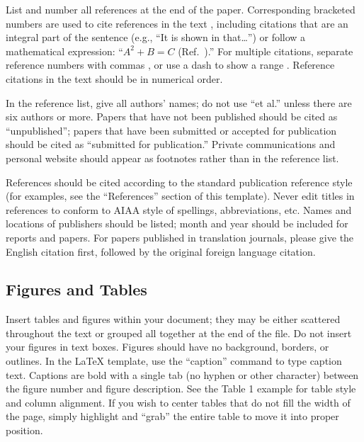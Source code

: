 \documentclass[journal]{new-aiaa}
\begin{document}
List and number all references at the end of the paper. Corresponding bracketed numbers are used to cite references in the text \cite{vatistas1986reverse}, including citations that are an integral part of the sentence (e.g., ``It is shown in \cite{dornheim1996planetary} that\ldots '') or follow a mathematical expression: ``$A^{2} + B = C$ (Ref.~\cite{terster1997nasa}).'' For multiple citations, separate reference numbers with commas \cite{peyret2012computational,oates1997aerothermodynamics}, or use a dash to show a range \cite{volpe1994techniques,thompsonspacecraft,chi1993fluid}. Reference citations in the text should be in numerical order.

In the reference list, give all authors' names; do not use ``et al.'' unless there are six authors or more. Papers that have not been published should be cited as ``unpublished''; papers that have been submitted or accepted for publication should be cited as ``submitted for publication.'' Private communications and personal website should appear as footnotes rather than in the reference list.

References should be cited according to the standard publication reference style (for examples, see the ``References'' section of this template). Never edit titles in references to conform to AIAA style of spellings, abbreviations, etc. Names and locations of publishers should be listed; month and year should be included for reports and papers. For papers published in translation journals, please give the English citation first, followed by the original foreign language citation.

\subsection{Figures and Tables}
Insert tables and figures within your document; they may be either scattered throughout the text or grouped all together at the end of the file. Do not insert your figures in text boxes. Figures should have no background, borders, or outlines. In the \LaTeX{} template, use the ``caption'' command to type caption text. Captions are bold with a single tab (no hyphen or other character) between the figure number and figure description. See the Table 1 example for table style and column alignment. If you wish to center tables that do not fill the width of the page, simply highlight and “grab” the entire table to move it into proper position.
\end{document}
